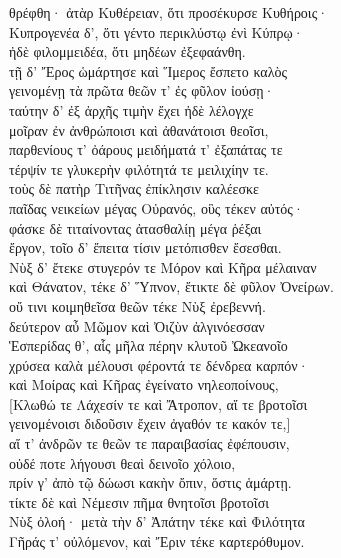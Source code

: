 \begin{pages}
\begin{Leftside}
θρέφθη· ἀτὰρ Κυθέρειαν, ὅτι προσέκυρσε Κυθήροις· \\
Κυπρογενέα δ', ὅτι γέντο περικλύστῳ ἐνὶ Κύπρῳ·\\
ἠδὲ φιλομμειδέα, ὅτι μηδέων ἐξεφαάνθη. \\
τῇ δ' Ἔρος ὡμάρτησε καὶ Ἵμερος ἔσπετο καλὸς\\
γεινομένῃ τὰ πρῶτα θεῶν τ' ἐς φῦλον ἰούσῃ· \\
ταύτην δ' ἐξ ἀρχῆς τιμὴν ἔχει ἠδὲ λέλογχε\\
μοῖραν ἐν ἀνθρώποισι καὶ ἀθανάτοισι θεοῖσι,\\
παρθενίους τ' ὀάρους μειδήματά τ' ἐξαπάτας τε \\
τέρψίν τε γλυκερὴν φιλότητά τε μειλιχίην τε.\\

\quad{}τοὺς δὲ πατὴρ Τιτῆνας ἐπίκλησιν καλέεσκε\\
παῖδας νεικείων μέγας Οὐρανός, οὓς τέκεν αὐτός· \\
φάσκε δὲ τιταίνοντας ἀτασθαλίῃ μέγα ῥέξαι\\
ἔργον, τοῖο δ' ἔπειτα τίσιν μετόπισθεν ἔσεσθαι. \\

\quad{}Νὺξ δ' ἔτεκε στυγερόν τε Μόρον καὶ Κῆρα μέλαιναν \\
καὶ Θάνατον, τέκε δ' Ὕπνον, ἔτικτε δὲ φῦλον Ὀνείρων. \\
οὔ τινι κοιμηθεῖσα θεῶν τέκε Νὺξ ἐρεβεννή. \\
δεύτερον αὖ Μῶμον καὶ Ὀιζὺν ἀλγινόεσσαν\\
Ἑσπερίδας θ', αἷς μῆλα πέρην κλυτοῦ Ὠκεανοῖο  \\
χρύσεα καλὰ μέλουσι φέροντά τε δένδρεα καρπόν·\\
καὶ Μοίρας καὶ Κῆρας ἐγείνατο νηλεοποίνους,\\
{[}Κλωθώ τε Λάχεσίν τε καὶ Ἄτροπον, αἵ τε βροτοῖσι \\
γεινομένοισι διδοῦσιν ἔχειν ἀγαθόν τε κακόν τε,{]} \\
αἵ τ' ἀνδρῶν τε θεῶν τε παραιβασίας ἐφέπουσιν,  \\
οὐδέ ποτε λήγουσι θεαὶ δεινοῖο χόλοιο,\\
πρίν γ' ἀπὸ τῷ δώωσι κακὴν ὄπιν, ὅστις ἁμάρτῃ.\\
τίκτε δὲ καὶ Νέμεσιν πῆμα θνητοῖσι βροτοῖσι \\
Νὺξ ὀλοή· μετὰ τὴν δ' Ἀπάτην τέκε καὶ Φιλότητα \\
Γῆράς τ' οὐλόμενον, καὶ Ἔριν τέκε καρτερόθυμον. \\


\end{Leftside}
\end{pages}
